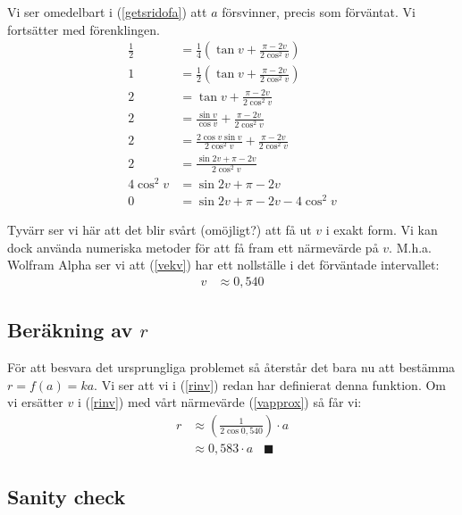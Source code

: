 \documentclass[10pt]{article}
\begin{document}
  Vi ser omedelbart i (\ref{getsridofa}) att $a$ försvinner, precis som förväntat. Vi fortsätter med förenklingen.
  \begin{align}
    \frac{1}{2} &= \frac{1}{4} \left( \tan v + \frac{\pi-2v}{2 \cos^2 v} \right) \nonumber \\
    1 &= \frac{1}{2} \left( \tan v + \frac{\pi-2v}{2 \cos^2 v} \right) \nonumber \\
    2 &= \tan v + \frac{\pi-2v}{2 \cos^2 v} \nonumber \\
    2 &= \frac{\sin v}{\cos v} + \frac{\pi-2v}{2 \cos^2 v} \nonumber \\
    2 &= \frac{2\cos v\sin v}{2\cos^2 v} + \frac{\pi-2v}{2 \cos^2 v} \nonumber \\
    2 &= \frac{\sin 2v + \pi - 2v}{2\cos^2 v} \nonumber \\
    4 \cos^2 v &= \sin 2v + \pi - 2v \nonumber \\
    0 &= \sin 2v + \pi - 2v - 4 \cos^2 v \label{vekv}
  \end{align}

  Tyvärr ser vi här att det blir svårt (omöjligt?) att få ut $v$ i exakt form. Vi kan dock använda numeriska metoder för att få fram ett närmevärde på $v$. M.h.a. Wolfram Alpha ser vi att (\ref{vekv}) har ett nollställe i det förväntade intervallet:
  \begin{align}
    v &\approx 0,540 \label{vapprox}
  \end{align}

  \subsection*{Beräkning av $r$}

  För att besvara det ursprungliga problemet så återstår det bara nu att bestämma $r = f(a) = ka$. Vi ser att vi i (\ref{rinv}) redan har definierat denna funktion. Om vi ersätter $v$ i (\ref{rinv}) med vårt närmevärde (\ref{vapprox}) så får vi:
  \begin{align}
    r &\approx \left(\frac{1}{2 \cos 0,540}\right) \cdot a \nonumber \\
    &\approx 0,583 \cdot a \hspace{10pt} \blacksquare \label{ranswer}
  \end{align}

  \subsection*{Sanity check}
\end{document}
